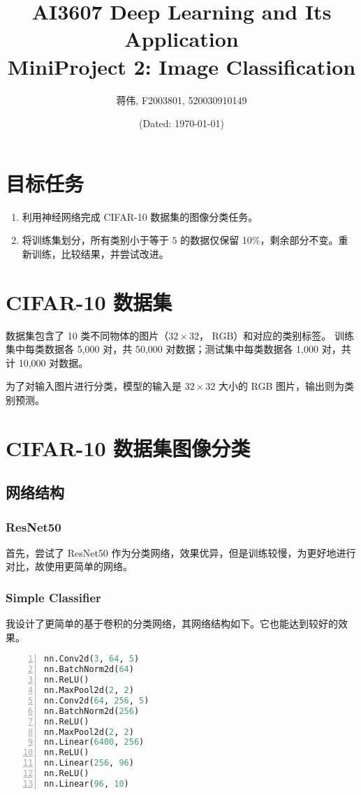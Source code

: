 \documentclass[a4paper]{article}
\title{AI3607 Deep Learning and Its Application\\MiniProject 2: Image Classification}
\author{\sffamily 蒋伟, F2003801, 520030910149}
\date{(Dated: \today)}
\begin{document}
\section{目标任务}
\begin{enumerate}
    \item 利用神经网络完成 CIFAR-10 数据集的图像分类任务。
    \item 将训练集划分，所有类别小于等于 $5$ 的数据仅保留 10\%，剩余部分不变。重新训练，比较结果，并尝试改进。
\end{enumerate}

\section{CIFAR-10 数据集}
数据集包含了 10 类不同物体的图片（$32\times 32$， RGB）和对应的类别标签。
训练集中每类数据各 5,000 对，共 50,000 对数据；测试集中每类数据各 1,000 对，共计 10,000 对数据。

为了对输入图片进行分类，模型的输入是 $32\times 32$ 大小的 RGB 图片，输出则为类别预测。

\section{CIFAR-10 数据集图像分类}
\subsection{网络结构}
\subsubsection{ResNet50}
首先，尝试了 ResNet50 \cite{resnet} 作为分类网络，效果优异，但是训练较慢，为更好地进行对比，故使用更简单的网络。
\subsubsection{Simple Classifier}
我设计了更简单的基于卷积的分类网络，其网络结构如下。它也能达到较好的效果。

\begin{multicols}{2}
    \begin{lstlisting}[language=Python, basicstyle=\ttfamily, numbers=left]
nn.Conv2d(3, 64, 5)
nn.BatchNorm2d(64)
nn.ReLU()
nn.MaxPool2d(2, 2)
nn.Conv2d(64, 256, 5)
nn.BatchNorm2d(256)
nn.ReLU()
nn.MaxPool2d(2, 2)
nn.Linear(6400, 256)
nn.ReLU()
nn.Linear(256, 96)
nn.ReLU()
nn.Linear(96, 10)
    \end{lstlisting}
\end{multicols}
\end{document}
